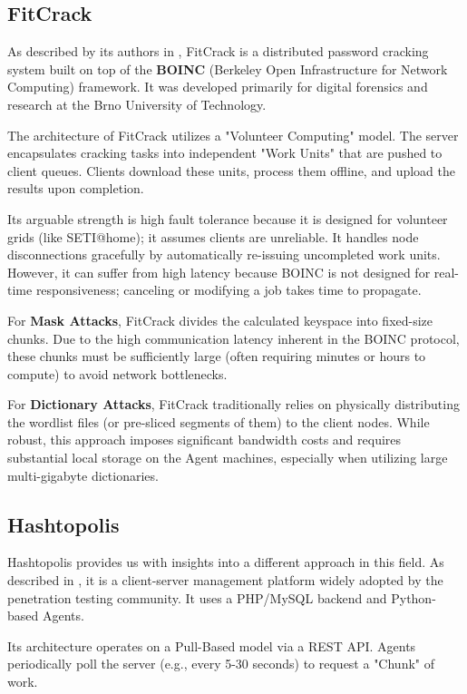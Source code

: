 \subsection{FitCrack}

As described by its authors in \cite{BUT168182}, FitCrack is a distributed password cracking system built on top of the \textbf{BOINC} (Berkeley Open Infrastructure for Network Computing) framework. It was developed primarily for digital forensics and research at the Brno University of Technology.

The architecture of FitCrack utilizes a "Volunteer Computing" model. The server encapsulates cracking tasks into independent "Work Units" that are pushed to client queues. Clients download these units, process them offline, and upload the results upon completion.

Its arguable strength is high fault tolerance because it is designed for volunteer grids (like SETI@home); it assumes clients are unreliable. It handles node disconnections gracefully by automatically re-issuing uncompleted work units. However, it can suffer from high latency because BOINC is not designed for real-time responsiveness; canceling or modifying a job takes time to propagate.

For \textbf{Mask Attacks}, FitCrack divides the calculated keyspace into fixed-size chunks. Due to the high communication latency inherent in the BOINC protocol, these chunks must be sufficiently large (often requiring minutes or hours to compute) to avoid network bottlenecks. 

For \textbf{Dictionary Attacks}, FitCrack traditionally relies on physically distributing the wordlist files (or pre-sliced segments of them) to the client nodes. While robust, this approach imposes significant bandwidth costs and requires substantial local storage on the Agent machines, especially when utilizing large multi-gigabyte dictionaries.

\subsection{Hashtopolis}

Hashtopolis provides us with insights into a different approach in this field. As described in \cite{hashtopolis}, it is a client-server management platform widely adopted by the penetration testing community. It uses a PHP/MySQL backend and Python-based Agents.

Its architecture operates on a Pull-Based model via a REST API. Agents periodically poll the server (e.g., every 5-30 seconds) to request a "Chunk" of work.

